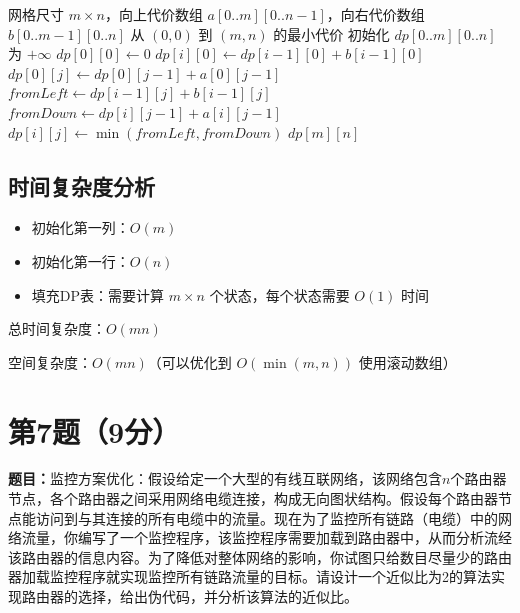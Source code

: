 \documentclass[UTF8,12pt,a4paper]{ctexart}
\begin{document}
\begin{algorithm}[H]
	\caption{最小代价网格路径}
	\begin{algorithmic}[1]
		\Require 网格尺寸 $m \times n$，向上代价数组 $a[0..m][0..n-1]$，向右代价数组 $b[0..m-1][0..n]$
		\Ensure 从 $(0,0)$ 到 $(m,n)$ 的最小代价
		\State 初始化 $dp[0..m][0..n]$ 为 $+\infty$
		\State $dp[0][0] \gets 0$
		 
			\State $dp[i][0] \gets dp[i-1][0] + b[i-1][0]$
		\EndFor
		 
			\State $dp[0][j] \gets dp[0][j-1] + a[0][j-1]$
		\EndFor
				\State $fromLeft \gets dp[i-1][j] + b[i-1][j]$
				\State $fromDown \gets dp[i][j-1] + a[i][j-1]$
				\State $dp[i][j] \gets \min(fromLeft, fromDown)$
			\EndFor
		\EndFor
		\State \Return $dp[m][n]$
	\end{algorithmic}
\end{algorithm}

\subsection*{时间复杂度分析}

\begin{itemize}
	\item 初始化第一列：$O(m)$
	\item 初始化第一行：$O(n)$
	\item 填充DP表：需要计算 $m \times n$ 个状态，每个状态需要 $O(1)$ 时间
\end{itemize}

总时间复杂度：$O(mn)$

空间复杂度：$O(mn)$（可以优化到 $O(\min(m,n))$ 使用滚动数组）


\section*{第7题（9分）}
\textbf{题目：}监控方案优化：假设给定一个大型的有线互联网络，该网络包含$n$个路由器节点，各个路由器之间采用网络电缆连接，构成无向图状结构。假设每个路由器节点能访问到与其连接的所有电缆中的流量。现在为了监控所有链路（电缆）中的网络流量，你编写了一个监控程序，该监控程序需要加载到路由器中，从而分析流经该路由器的信息内容。为了降低对整体网络的影响，你试图只给数目尽量少的路由器加载监控程序就实现监控所有链路流量的目标。请设计一个近似比为2的算法实现路由器的选择，给出伪代码，并分析该算法的近似比。
\end{document}
